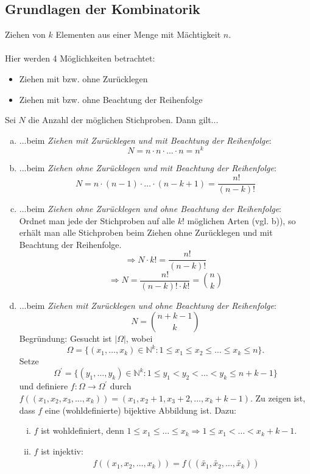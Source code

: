 \documentclass[a4paper,12pt,fleqn]{scrartcl}
\newcommand{\N}{\mathbb{N}}
\newcommand{\impl}{\Rightarrow}
\theoremstyle{definition}
\theoremstyle{plain}
\theoremstyle{remark}
\begin{document}
\subsection{Grundlagen der Kombinatorik}
Ziehen von $k$ Elementen aus einer Menge mit Mächtigkeit $n$.\\
\\
Hier werden 4 Möglichkeiten betrachtet:
\begin{itemize}
\item Ziehen mit bzw. ohne Zurücklegen
\item Ziehen mit bzw. ohne Beachtung der Reihenfolge
\end{itemize}
Sei $N$ die Anzahl der möglichen Stichproben. Dann gilt...
\begin{enumerate}[a)]
\item ...beim \emph{Ziehen mit Zurücklegen und mit Beachtung der Reihenfolge}:
\[N = n \cdot n \cdot \ldots \cdot n = n^{k}\]
\item ...beim \emph{Ziehen ohne Zurücklegen und mit Beachtung der Reihenfolge}:
\[N = n \cdot (n-1) \cdot \ldots \cdot (n-k+1) = \frac{n!}{(n-k)!}\]
\item ...beim \emph{Ziehen ohne Zurücklegen und ohne Beachtung der Reihenfolge}:\\
Ordnet man jede der Stichproben auf alle $k!$ möglichen Arten (vgl. b)), so erhält man alle Stichproben beim Ziehen ohne Zurücklegen und mit Beachtung der Reihenfolge.
\[\impl N \cdot k! = \frac{n!}{(n-k)!}\]
\[\impl N = \frac{n!}{(n-k)! \cdot k!} = \binom{n}{k}\]
\item ...beim \emph{Ziehen mit Zurücklegen und ohne Beachtung der Reihenfolge}:
\[N = \binom{n+k-1}{k}\]
Begründung: Gesucht ist $| \Omega |$, wobei 
\[\Omega=\{(x_1, \ldots, x_k) \in \N^{k}:1 \leq x_1 \leq x_2 \leq \ldots \leq x_k \leq n\}.\]
Setze \[\Omega^\prime=\{(y_1, \ldots, y_k) \in \N^{k}:1 \leq y_1 < y_2 < \ldots < y_k \leq n+k-1\}\] und definiere $f: \Omega \rightarrow \Omega^\prime$ durch $f((x_1, x_2, x_3, \ldots, x_k)) = (x_1, x_2+1, x_3+2, \ldots, x_k+k-1)$. Zu zeigen ist, dass $f$ eine (wohldefinierte) bijektive Abbildung ist. Dazu:
\begin{enumerate}[(i)]
\item $f$ ist wohldefiniert, denn $1 \leq x_1 \leq \ldots \leq x_k \impl 1 \leq x_1 < \ldots < x_k+k-1$.
\item $f$ ist injektiv:
\begin{align*}
&f((x_1, x_2, \ldots, x_k)) = f((\widetilde{x_1}, \widetilde{x_2}, \ldots, \widetilde{x_k})) \\

\end{align*}
\end{enumerate}
\end{enumerate}
\end{document}

